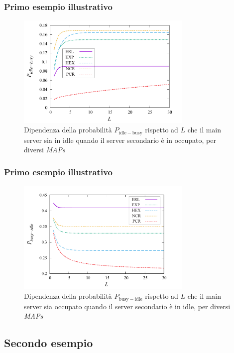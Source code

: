 \documentclass{beamer}
\begin{document}
\begin{frame}
    \frametitle{Primo esempio illustrativo}
    \begin{figure}[h]
        \centering
        \includegraphics[width=0.75\textwidth]{VrxLKYI.png}
        \caption{Dipendenza della probabilità $P_{\mathrm{idle-busy}}$ rispetto ad $L$ che il main server sia in idle quando il server secondario è in occupato, per diversi \emph{MAPs}}
        \label{fig:4}
    \end{figure}
\end{frame}


\begin{frame}
    \frametitle{Primo esempio illustrativo}
    \begin{figure}
        \centering
        \includegraphics[width=0.75\textwidth]{EZp90oP.png}
        \caption{Dipendenza della probabilità $P_{\mathrm{busy-idle}}$ rispetto ad $L$ che il main server sia occupato quando il server secondario è in idle, per diversi \emph{MAPs}}
        \label{fig:5}
    \end{figure}
\end{frame}


\subsection{Secondo esempio}
\end{document}
